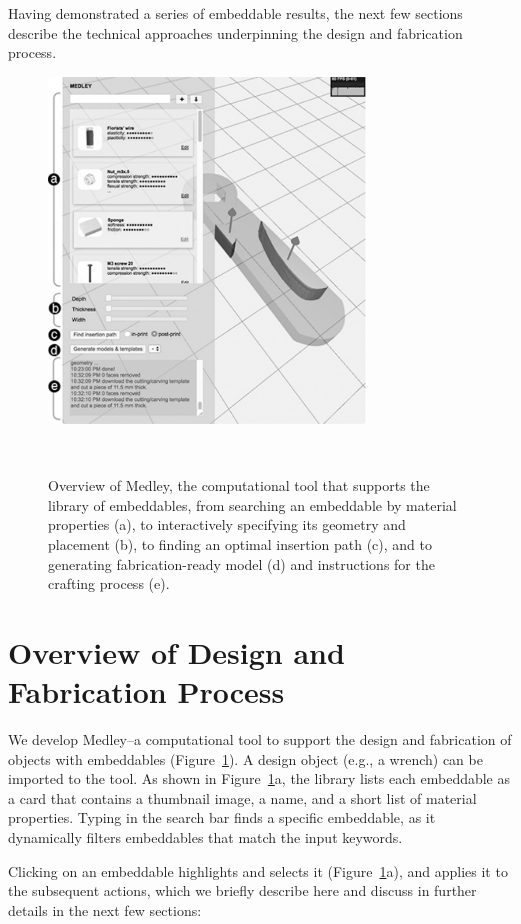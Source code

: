 Having demonstrated a series of embeddable results, the next few sections  describe the technical approaches underpinning the design and fabrication process.


\begin{figure} [h!]
  \centering
  \includegraphics[width=0.75\textwidth]{figures/tool_overview}
  \caption{Overview of Medley, the computational tool that supports the library of embeddables, from searching an embeddable by material properties (a), to interactively specifying its geometry and placement (b), to finding an optimal insertion path (c), and to generating fabrication-ready model (d) and instructions for the crafting process (e).}~\label{fig:tool_overview}
\end{figure}

\section{Overview of Design and Fabrication Process}
We develop Medley--a computational tool to support the design and fabrication of objects with embeddables (Figure~\ref{fig:tool_overview}). A design object (e.g., a wrench) can be imported to the tool. As shown in Figure~\ref{fig:tool_overview}a, the library lists each embeddable  as a card that contains a thumbnail image, a name, and a short list of material properties. Typing in the search bar finds a specific embeddable, as it dynamically filters  embeddables that match the input keywords. 

Clicking on an embeddable highlights and selects it (Figure~\ref{fig:tool_overview}a), and applies it to the subsequent actions, which we briefly describe here and discuss in further details in the next few sections:

